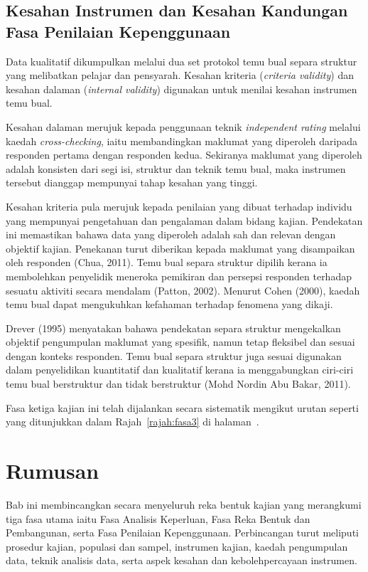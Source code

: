 \begin{itemize}
\subsection{Kesahan Instrumen dan Kesahan Kandungan Fasa Penilaian Kepenggunaan}

Data kualitatif dikumpulkan melalui dua set protokol temu bual separa struktur yang melibatkan pelajar dan pensyarah. Kesahan kriteria (\textit{criteria validity}) dan kesahan dalaman (\textit{internal validity}) digunakan untuk menilai kesahan instrumen temu bual.

Kesahan dalaman merujuk kepada penggunaan teknik \textit{independent rating} melalui kaedah \textit{cross-checking}, iaitu membandingkan maklumat yang diperoleh daripada responden pertama dengan responden kedua. Sekiranya maklumat yang diperoleh adalah konsisten dari segi isi, struktur dan teknik temu bual, maka instrumen tersebut dianggap mempunyai tahap kesahan yang tinggi.

Kesahan kriteria pula merujuk kepada penilaian yang dibuat terhadap individu yang mempunyai pengetahuan dan pengalaman dalam bidang kajian. Pendekatan ini memastikan bahawa data yang diperoleh adalah sah dan relevan dengan objektif kajian.
Penekanan turut diberikan kepada maklumat yang disampaikan oleh responden (Chua, 2011). Temu bual separa struktur dipilih kerana ia membolehkan penyelidik meneroka pemikiran dan persepsi responden terhadap sesuatu aktiviti secara mendalam (Patton, 2002). Menurut Cohen (2000), kaedah temu bual dapat mengukuhkan kefahaman terhadap fenomena yang dikaji.

Drever (1995) menyatakan bahawa pendekatan separa struktur mengekalkan objektif pengumpulan maklumat yang spesifik, namun tetap fleksibel dan sesuai dengan konteks responden. Temu bual separa struktur juga sesuai digunakan dalam penyelidikan kuantitatif dan kualitatif kerana ia menggabungkan ciri-ciri temu bual berstruktur dan tidak berstruktur (Mohd Nordin Abu Bakar, 2011).

Fasa ketiga kajian ini telah dijalankan secara sistematik mengikut urutan seperti yang ditunjukkan dalam Rajah~\ref{rajah:fasa3} di halaman~\pageref{rajah:fasa3}.
\section{Rumusan}

Bab ini membincangkan secara menyeluruh reka bentuk kajian yang merangkumi tiga fasa utama iaitu Fasa Analisis Keperluan, Fasa Reka Bentuk dan Pembangunan, serta Fasa Penilaian Kepenggunaan. Perbincangan turut meliputi prosedur kajian, populasi dan sampel, instrumen kajian, kaedah pengumpulan data, teknik analisis data, serta aspek kesahan dan kebolehpercayaan instrumen.


\end{itemize}

